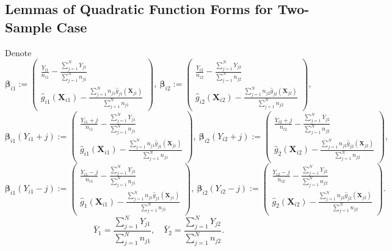 \documentclass[12pt,letterpaper]{article}
\begin{document}
\subsection{Lemmas of Quadratic Function Forms for Two-Sample Case}
Denote 
{\small$$\boldsymbol{\beta}_{i1}:=\begin{pmatrix}
\displaystyle\frac{Y_{i1}}{n_{i1}}-\frac{\sum_{j=1}^NY_{j1}}{\sum_{j=1}^Nn_{j1}}\\
\displaystyle\hat{g}_{i1}(\mathbf{X}_{i1})-\frac{\sum_{j=1}^Nn_{j1}\hat{g}_{j1}(\mathbf{X}_{j1})}{\sum_{j=1}^Nn_{j1}}
\end{pmatrix},\ \boldsymbol{\beta}_{i2}:=\begin{pmatrix}
\displaystyle\frac{Y_{i2}}{n_{i2}}-\frac{\sum_{j=1}^NY_{j2}}{\sum_{j=1}^Nn_{j2}}\\
\displaystyle\hat{g}_{i2}(\mathbf{X}_{i2})-\frac{\sum_{j=1}^Nn_{j2}\hat{g}_{j2}(\mathbf{X}_{j2})}{\sum_{j=1}^Nn_{j2}}
\end{pmatrix},$$}
{\small$$\boldsymbol{\beta}_{i1}(Y_{i1}+j):=\begin{pmatrix}
\displaystyle\frac{Y_{i1}+j}{n_{i1}}-\frac{\sum_{j=1}^NY_{j1}}{\sum_{j=1}^Nn_{j1}}\\
\displaystyle\hat{g}_{i1}(\mathbf{X}_{i1})-\frac{\sum_{j=1}^Nn_{j1}\hat{g}_{j1}(\mathbf{X}_{j1})}{\sum_{j=1}^Nn_{j1}}
\end{pmatrix},\ \boldsymbol{\beta}_{i2}(Y_{i2}+j):=\begin{pmatrix}
\displaystyle\frac{Y_{i2}+j}{n_{i2}}-\frac{\sum_{j=1}^NY_{j2}}{\sum_{j=1}^Nn_{j2}}\\
\displaystyle\hat{g}_{2}(\mathbf{X}_{i2})-\frac{\sum_{j=1}^Nn_{j2}\hat{g}_{j2}(\mathbf{X}_{j2})}{\sum_{j=1}^Nn_{j2}}
\end{pmatrix},$$}
{\small$$\boldsymbol{\beta}_{i1}(Y_{i1}-j):=\begin{pmatrix}
\displaystyle\frac{Y_{i1}-j}{n_{i1}}-\frac{\sum_{j=1}^NY_{j1}}{\sum_{j=1}^Nn_{j1}}\\
\displaystyle\hat{g}_{1}(\mathbf{X}_{i1})-\frac{\sum_{j=1}^Nn_{j1}\hat{g}_{j1}(\mathbf{X}_{j1})}{\sum_{j=1}^Nn_{j1}}
\end{pmatrix},\ \boldsymbol{\beta}_{i2}(Y_{i2}-j):=\begin{pmatrix}
\displaystyle\frac{Y_{i2}-j}{n_{i2}}-\frac{\sum_{j=1}^NY_{j2}}{\sum_{j=1}^Nn_{j2}}\\
\displaystyle\hat{g}_{2}(\mathbf{X}_{i2})-\frac{\sum_{j=1}^Nn_{j2}\hat{g}_{j2}(\mathbf{X}_{j2})}{\sum_{j=1}^Nn_{j2}}
\end{pmatrix}.$$}
\begin{equation}\label{eq:two-sample:average:Y}
    \bar{Y}_1=\frac{\sum_{j=1}^NY_{j1}}{\sum_{j=1}^Nn_{j1}},\quad \bar{Y}_2=\frac{\sum_{j=1}^NY_{j2}}{\sum_{j=1}^Nn_{j2}}.
\end{equation}
\end{document}

